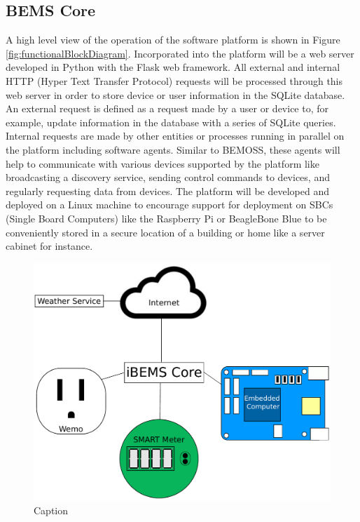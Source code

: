 \documentclass[12pt]{article} %
\begin{document}
\subsection{BEMS Core}
A high level view of the operation of the software platform is shown in Figure \ref{fig:functionalBlockDiagram}. Incorporated into the platform will be a web server developed in Python with the Flask web framework. All external and internal HTTP (Hyper Text Transfer Protocol) requests will be processed through this web server in order to store device or user information in the SQLite database. An external request is defined as a request made by a user or device to, for example, update information in the database with a series of SQLite queries. Internal requests are made by other entities or processes running in parallel on the platform including software agents. Similar to BEMOSS, these agents will help to communicate with various devices supported by the platform like broadcasting a discovery service, sending control commands to devices, and regularly requesting data from devices. The platform will be developed and deployed on a Linux machine to encourage support for deployment on SBCs (Single Board Computers) like the Raspberry Pi or BeagleBone Blue to be conveniently stored in a secure location of a building or home like a server cabinet for instance.
\begin{figure}[H]
    \centering
    \includegraphics[scale=0.35]{figs/highLevelArchitecture.pdf}
    \caption{Caption}
    \label{fig:my_label}
\end{figure}
\medbreak\noindent
\end{document}
